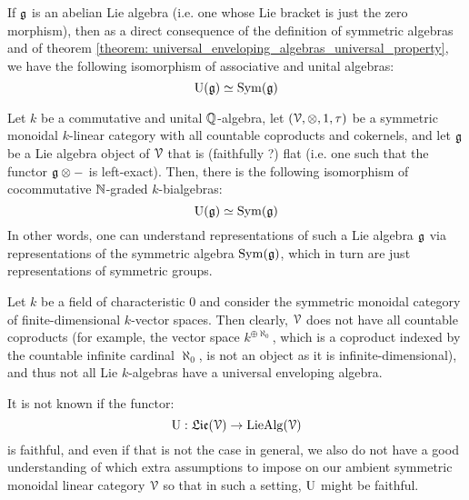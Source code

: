             \begin{example}
                If $\mathfrak{g}$ is an abelian Lie algebra (i.e. one whose Lie bracket is just the zero morphism), then as a direct consequence of the definition of symmetric algebras and of theorem \ref{theorem: universal_enveloping_algebras_universal_property}, we have the following isomorphism of associative and unital algebras:
                    $$\mathrm{U}(\mathfrak{g}) \simeq \mathrm{Sym}(\mathfrak{g})$$
            \end{example}
            \begin{example}
                Let $k$ be a commutative and unital $\mathbb{Q}$-algebra, let $(\calV, \tensor, 1, \tau)$ be a symmetric monoidal $k$-linear category with all countable coproducts and cokernels, and let $\mathfrak{g}$ be a Lie algebra object of $\mathcal{V}$ that is (faithfully ?) flat (i.e. one such that the functor $\g \tensor -$ is left-exact). Then, there is the following isomorphism of cocommutative $\mathbb{N}$-graded $k$-bialgebras:
                    $$\mathrm{U}(\mathfrak{g}) \simeq \mathrm{Sym}(\mathfrak{g})$$
                In other words, one can understand representations of such a Lie algebra $\mathfrak{g}$ via representations of the symmetric algebra $\mathrm{Sym}(\mathfrak{g})$, which in turn are just representations of symmetric groups.
            \end{example}
            \begin{example}
                Let $k$ be a field of characteristic $0$ and consider the symmetric monoidal category of finite-dimensional $k$-vector spaces. Then clearly, $\mathcal{V}$ does not have all countable coproducts (for example, the vector space $k^{\oplus \aleph_0}$, which is a coproduct indexed by the countable infinite cardinal $\aleph_0$, is not an object as it is infinite-dimensional), and thus not all Lie $k$-algebras have a universal enveloping algebra.
            \end{example}
            \begin{example}
                It is not known if the functor:
                    $$\mathrm{U}: \mathfrak{Lie}(\mathcal{V}) \to \mathrm{Lie}\mathrm{Alg}(\mathcal{V})$$
                is faithful, and even if that is not the case in general, we also do not have a good understanding of which extra assumptions to impose on our ambient symmetric monoidal linear category $\mathcal{V}$ so that in such a setting, $\mathrm{U}$ might be faithful. 
            \end{example}
            
